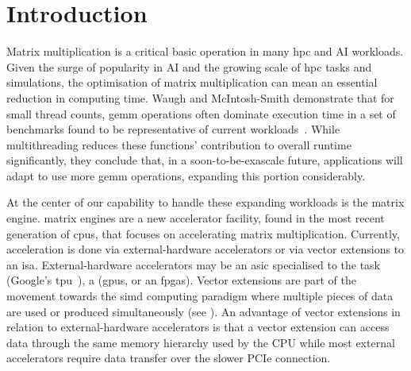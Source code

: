 \documentclass[\main/thesis.tex]{subfiles}
\begin{document}
\chapter{Introduction}
\label{cha:intro}

Matrix multiplication is a critical basic operation in many \gls{hpc} and AI workloads.
Given the surge of popularity in AI and the growing scale of \gls{hpc} tasks and simulations, the optimisation of matrix multiplication can mean an essential reduction in computing time.
Waugh and McIntosh-Smith demonstrate that for small thread counts, \gls{gemm} operations often dominate execution time in a set of benchmarks found to be representative of current workloads~\autocite{waugh2020use}.
While multithreading reduces these functions' contribution to overall runtime significantly, they conclude that, in a soon-to-be-exascale future, applications will adapt to use more \gls{gemm} operations, expanding this portion considerably.

At the center of our capability to handle these expanding workloads is the \gls{matrix engine}.
\Glspl{matrix engine} are a new accelerator facility, found in the most recent generation of \glspl{cpu}, that focuses on accelerating matrix multiplication.
Currently, acceleration is done via external-hardware accelerators or via vector extensions to an \gls{isa}.
External-hardware accelerators may be an \gls{asic} specialised to the task (\eg Google's \gls{tpu}~\autocite{abadi2016tensorflow}), a (\eg \glspl{gpu}, or an \glspl{fpga}).
Vector extensions are part of the movement towards the \gls{simd} computing paradigm where multiple pieces of data are used or produced simultaneously (see ).
An advantage of vector extensions in relation to external-hardware accelerators is that a vector extension can access data through the same memory hierarchy used by the CPU while most external accelerators require data transfer over the slower PCIe connection.
\end{document}
